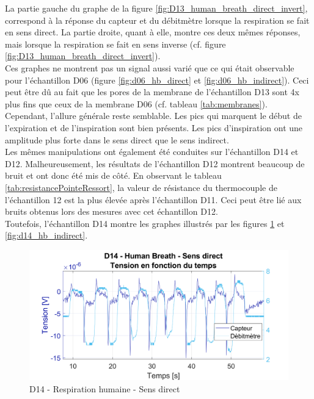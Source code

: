 La partie gauche du graphe de la figure \ref{fig:D13_human_breath_direct_invert}, correspond à la réponse du capteur et du débitmètre lorsque la 
respiration se fait en sens direct. La partie droite, quant à elle, montre ces deux mêmes réponses, mais lorsque la respiration se fait en sens 
inverse (cf. figure \ref{fig:D13_human_breath_direct_invert}). \\
Ces graphes ne montrent pas un signal aussi varié que ce qui était observable pour l'échantillon D06 (figure 
\ref{fig:d06_hb_direct} et \ref{fig:d06_hb_indirect}). Ceci peut être dû au fait que les pores de la membrane de l'échantillon D13 sont 4x plus 
fins que ceux de la membrane D06 (cf. tableau \ref{tab:membranes}). \\
Cependant, l'allure générale reste semblable. Les pics qui marquent le début de l'expiration et de l'inspiration sont bien présents. Les pics 
d'inspiration ont une amplitude plus forte dans le sens direct que le sens indirect. \\

Les mêmes manipulations ont également été conduites sur l'échantillon D14 et D12. Malheureusement, les résultats de l'échantillon D12 montrent 
beaucoup de bruit et ont donc été mis de côté. En observant le tableau \ref{tab:resistancePointeRessort}, la valeur de résistance du thermocouple 
de l'échantillon 12 est la plus élevée après l'échantillon D11. Ceci peut être lié aux bruits obtenus lors des mesures avec cet échantillon D12. \\

\newpage
Toutefois, l'échantillon D14 montre les graphes illustrés par les figures \ref{fig:d14_hb_direct} et \ref{fig:d14_hb_indirect}. 


\begin{figure}[H]
    \centering
    \includegraphics[scale = 0.52]{assets/figures/D14_hb_sensDirect.svg}
    \caption{D14 - Respiration humaine - Sens direct}
    \label{fig:d14_hb_direct}
\end{figure}


